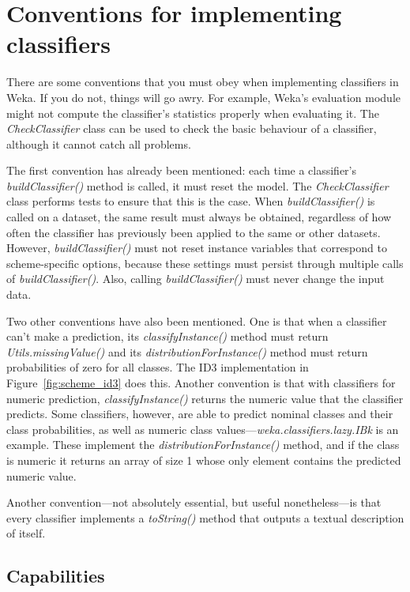 \section{Conventions for implementing classifiers}
\label{subsec:conventions}

There are some conventions that you must obey when implementing
classifiers in Weka. If you do not, things will go awry. For example,
Weka's evaluation module might not compute the classifier's statistics
properly when evaluating it. The \textit{CheckClassifier} class can be used to
check the basic behaviour of a classifier, although it cannot catch
all problems.

The first convention has already been mentioned: each time a
classifier's \textit{buildClassifier()} method is called, it must reset the
model. The \textit{CheckClassifier} class performs tests to ensure that this is
the case. When \textit{buildClassifier()} is called on a dataset, the same
result must always be obtained, regardless of how often the classifier
has previously been applied to the same or other datasets. However,
\textit{buildClassifier()} must not reset instance variables that correspond to
scheme-specific options, because these settings must persist through
multiple calls of \textit{buildClassifier()}. Also,
calling \textit{buildClassifier()} must never change the input data.

Two other conventions have also been mentioned. One is that when a
classifier can't make a prediction, its \textit{classifyInstance()}
method must return \textit{Utils.missingValue()} and
its \textit{distributionForInstance()} method must return
probabilities of zero for all classes. The ID3 implementation in
Figure~\ref{fig:scheme_id3} does this. Another convention is that with
classifiers for numeric prediction, \textit{classifyInstance()}
returns the numeric value that the classifier predicts. Some
classifiers, however, are able to predict nominal classes and their
class probabilities, as well as numeric class
values---\textit{weka.classifiers.lazy.IBk} is an example. These implement the
\textit{distributionForInstance()} method, and if the class is numeric it
returns an array of size 1 whose only element contains the predicted
numeric value.

Another convention---not absolutely essential, but useful
nonetheless---is that every classifier implements
a \textit{toString()} method that outputs a textual description of
itself.

\subsection{Capabilities}

